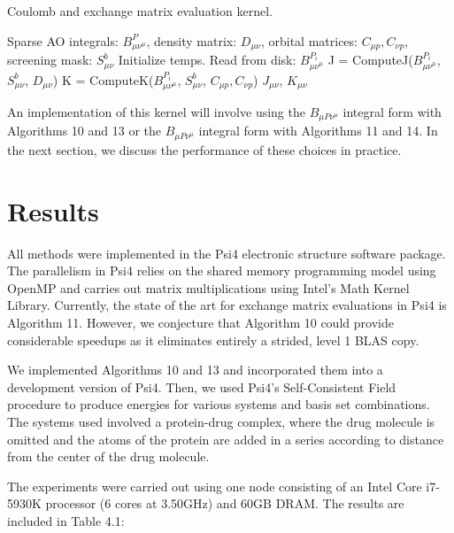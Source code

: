 \begin{algorithm}[H]
\caption{Coulomb and exchange matrix evaluation kernel.}
\begin{algorithmic}
\REQUIRE Sparse AO integrals: $B^P_{\mu \nu^{\mu}}$, density matrix: $D_{\mu \nu}$, orbital matrices: $C_{\mu p}, C_{\nu p}$, screening mask: $S_{\mu \nu}^b$
\STATE Initialize temps.
    \STATE Read from disk: $B^{P_i}_{\mu \nu^{\mu}}$
    \STATE J = ComputeJ($B^{P_i}_{\mu \nu^{\mu}}$, $S_{\mu \nu}^b$, $D_{\mu \nu}$)
    \STATE K = ComputeK($B^{P_i}_{\mu \nu^{\mu}}$, $S_{\mu \nu}^b$, $C_{\mu p}, C_{\nu p}$)
\ENDFOR
\RETURN $J_{\mu \nu}$, $K_{\mu \nu}$
\end{algorithmic}
\end{algorithm}

\noindent An implementation of this kernel will involve using the $B_{\mu P \nu^\mu}$ integral form with Algorithms 10 and 13 or the 
$B_{\mu P \nu^\mu}$ integral form with Algorithms 11 and 14. In the next section, we discuss the performance of these choices in practice.

\section{Results}

All methods were implemented in the {\sc Psi4} electronic structure software package.
The parallelism in {\sc Psi4} relies on the shared memory programming model using OpenMP 
and carries out matrix multiplications using Intel's Math Kernel
Library. Currently, the state of the art for exchange matrix evaluations in
{\sc Psi4} is Algorithm 11. However, we conjecture that Algorithm 10 could provide 
considerable speedups as it eliminates entirely a strided, level 1 BLAS copy. 

We implemented Algorithms 10 and 13 and incorporated them into a development version of {\sc Psi4}. 
Then, we used {\sc Psi4}'s Self-Consistent Field
procedure to produce energies for various systems and basis set combinations. The systems used involved a protein-drug complex,
where the drug molecule is omitted and the atoms of the protein are added in a series according to distance from the center of
the drug molecule. 

The experiments were carried out using one node consisting of an Intel Core i7-5930K processor
(6 cores at 3.50GHz) and 60GB DRAM. The results are included in Table 4.1:

